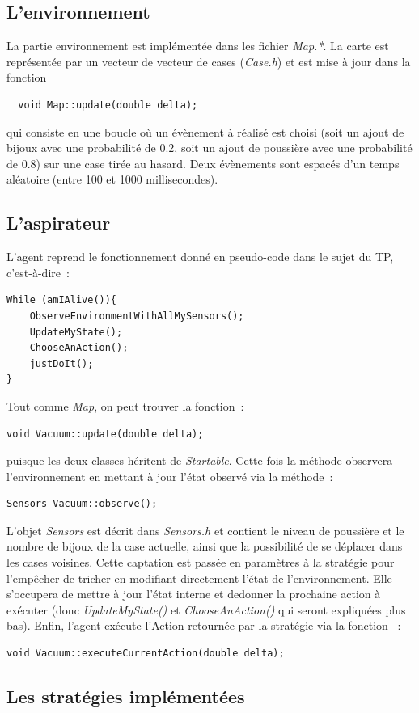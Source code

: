 \documentclass{article}
\begin{document}
\subsection{L'environnement}
La partie environnement est implémentée dans les fichier \emph{Map.*}. La carte
est représentée par un vecteur de vecteur de cases (\emph{Case.h}) et est mise à
jour dans la fonction \begin{verbatim}
  void Map::update(double delta);
\end{verbatim}
qui consiste en une boucle où un évènement à réalisé est choisi (soit un ajout
de bijoux avec une probabilité de 0.2, soit un ajout de poussière avec une
probabilité de 0.8) sur une case tirée au hasard. Deux évènements sont espacés
d'un temps aléatoire (entre 100 et 1000 millisecondes).
\subsection{L'aspirateur}
L'agent reprend le fonctionnement donné en pseudo-code dans le sujet du TP,
c'est-à-dire~:
\begin{verbatim}
While (amIAlive()){
    ObserveEnvironmentWithAllMySensors();
    UpdateMyState();
    ChooseAnAction();
    justDoIt();
}
\end{verbatim}
Tout comme \emph{Map}, on peut trouver la fonction~:
\begin{verbatim}
void Vacuum::update(double delta);
\end{verbatim}
puisque les deux classes héritent de \emph{Startable}. Cette fois la méthode
observera l'environnement en mettant à jour l'état observé via la méthode~:
\begin{verbatim}
Sensors Vacuum::observe();
\end{verbatim}
L'objet \emph{Sensors} est décrit dans \emph{Sensors.h} et contient le niveau de
poussière et le nombre de bijoux de la case actuelle, ainsi que la possibilité
de se déplacer dans les cases voisines. Cette captation est passée en paramètres
à la stratégie pour l'empêcher de tricher en modifiant directement l'état de
l'environnement. Elle s'occupera de mettre à jour l'état interne et dedonner la
prochaine action à exécuter (donc \emph{UpdateMyState()} et
\emph{ChooseAnAction()} qui seront expliquées plus bas). Enfin, l'agent exécute
l'Action retournée par la stratégie via la fonction ~:
\begin{verbatim}
void Vacuum::executeCurrentAction(double delta);
\end{verbatim}
\subsection{Les stratégies implémentées}
\end{document}
